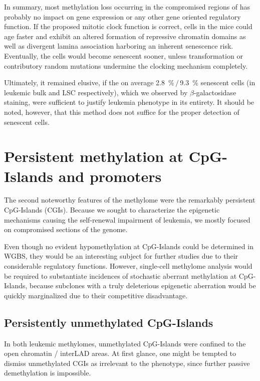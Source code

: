 In summary, most methylation loss occurring in the compromised regions of \dnmtchip has probably no impact on gene expression or any other gene oriented regulatory function. If the proposed mitotic clock function is correct, cells in the \dnmtchip mice could age faster and exhibit an altered formation of repressive chromatin domains as well as divergent lamina association harboring an inherent senescence risk. Eventually, the cells would become senescent sooner, unless \mllafnine transformation or contributory random mutations undermine the clocking mechanism completely. 

Ultimately, it remained elusive, if the on average  \SI{2.8}{\percent}$\,/  \,$\SI{9.3}{\percent} senescent cells (in leukemic bulk and LSC respectively), which we observed by \ensuremath{\beta}-galactosidase staining, were sufficient to justify \dnmtchip leukemia phenotype in its entirety. It should be noted, however, that this method does not suffice for the proper detection of senescent cells\cite{Gorgoulis2019}. 
 
\section{Persistent methylation at CpG-Islands and promoters}
\label{chap:d:methylation:persistentregions:cgi}

The second noteworthy features of the \dnmtchip methylome were the remarkably persistent CpG-Islands (CGIs). Because we sought to characterize the epigenetic mechanisms causing the self-renewal impairment of \dnmtchip leukemia, we mostly focused on compromised sections of the genome. 

Even though no evident hypomethylation at CpG-Islands could be determined in WGBS, they would be an interesting subject for further studies due to their considerable regulatory functions. However, single-cell methylome analysis would be required to substantiate incidences of stochastic aberrant methylation at CpG-Islands, because subclones with a truly deleterious epigenetic aberration would be quickly marginalized due to their competitive disadvantage\cite{Welch2012,Jan2013,Assenov2018}.

\subsection{Persistently unmethylated CpG-Islands} 
\label{chap:d:methylation:persistentregions:cgi:umeth}

In both leukemic methylomes, unmethylated CpG-Islands were confined to the open chromatin / interLAD areas. At first glance, one might be tempted to dismiss unmethylated CGIs as irrelevant to the \dnmtchip phenotype, since further passive demethylation is impossible. 


